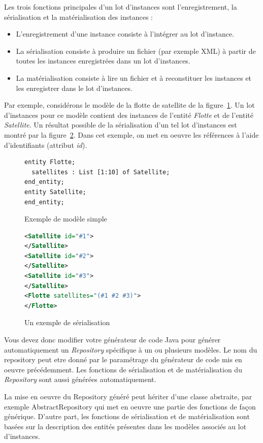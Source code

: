\documentclass[12pt]{article}
\begin{document}
Les trois fonctions principales d'un lot d'instances sont l'enregistrement, la sérialisation et la matérialisation des instances :
\begin{itemize}
\item L'enregistrement d'une instance consiste à l'intégrer au lot d'instance. 
\item La sérialisation consiste à produire un fichier (par exemple XML) à partir de toutes les instances enregistrées dans un lot d'instances. 
\item La matérialisation consiste à lire un fichier et à reconstituer les instances et les enregistrer dans le lot d'instances.
\end{itemize}

Par exemple, considérons le modèle de la flotte de satellite de la figure~\ref{fig:exemple-minispec8}. Un lot d'instances pour ce modèle contient des instances de l'entité \textit{Flotte} et de l'entité \textit{Satellite}. Un résultat possible de la sérialisation d'un tel lot d'instances est montré par la figure~\ref{fig:exemple-serialisation-XML}. Dans cet exemple, on met en oeuvre les références à l'aide d'identifiants (attribut \textit{id}).

\begin{figure}
\begin{lstlisting}[language=express]
entity Flotte;
  satellites : List [1:10] of Satellite;
end_entity;
entity Satellite;
end_entity;
\end{lstlisting}
\caption{Exemple de modèle simple}
\label{fig:exemple-minispec8}
\end{figure}

\begin{figure}
\begin{lstlisting}[language=XML]
<Satellite id="#1">
</Satellite>
<Satellite id="#2">
</Satellite>
<Satellite id="#3">
</Satellite>
<Flotte satellites="(#1 #2 #3)">
</Flotte>
\end{lstlisting}
\caption{Un exemple de sérialisation}
\label{fig:exemple-serialisation-XML}
\end{figure} 

Vous devez donc modifier votre générateur de code Java pour générer automatiquement un \textit{Repository} spécifique à un ou plusieurs modèles. Le nom du repository peut etre donné par le paramétrage du générateur de code mis en oeuvre précédemment. Les fonctions de sérialisation et de matérialisation du \textit{Repository} sont aussi générées automatiquement. 

La mise en oeuvre du Repository généré peut hériter d'une classe abstraite, par exemple AbstractRepository qui met en oeuvre une partie des fonctions de façon générique. D'autre part, les fonctions de sérialisation et de matérialisation sont basées sur la description des entités présentes dans les modèles associés au lot d'instances.
\end{document}
